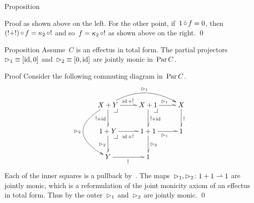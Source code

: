 \documentclass[b]{subfiles}
\begin{document}
\begin{parsec}
\begin{point}[pardp]{Proposition}
\begin{point}{Proof}
    as shown above on the left.
For the other point, if~$1 \mathop{\hat\circ} f = 0$,
    then~$(!+!)\mathop{\circ} f = \kappa_2 \mathop{\circ} !$
    and so~$f = \kappa_2 \mathop{\circ} !$ as shown above on the right. \qed
\end{point}
\end{point}
\begin{point}{Proposition}%
    Assume~$C$ is an effectus in total form.
    The partial projectors~$\mathord{\vartriangleright}_1 \equiv [\operatorname{id},0]$
        and~$\mathord{\vartriangleright}_2 \equiv [0, \operatorname{id}]$
        are jointly monic in~$\operatorname{Par} C$.
\begin{point}{Proof}%
Consider the following commuting diagram in~$\operatorname{Par} C$.
\begin{equation*}
\xymatrix {
    X+Y \pullback
    \ar@/^1.5pc/[rr]^{\pproj_1}
    \ar@/_3pc/[dd]_{\pproj_2}
        \ar@^{>}[r]^{\id+\hat!}
        \ar@^{>}[d]_{\hat! + \id}
& X+1 \pullback
        \ar@^{>}[r]^{\pproj_1}
        \ar@^{>}[d]^{\hat! + \id}
& X
        \ar@^{>}[d]^{\hat!}
\\ 1+Y \pullback
        \ar@^{>}[r]_{\id+\hat!}
        \ar@^{>}[d]_{\pproj_2}
& 1+1
        \ar@^{>}[r]_{\pproj_1}
        \ar@^{>}[d]^{\pproj_2}
& 1
\\ Y
        \ar@^{>}[r]_{\hat!}
& 1
}
\end{equation*}
Each of the inner squares is a pullback by~.
The maps~$\mathord{\vartriangleright}_1,\mathord{\vartriangleright}_2\colon 1 + 1 \rightharpoonup 1$
    are jointly monic,
    which is a reformulation
    of the joint monicity axiom of an effectus in total form.
Thus by 
    the outer~$\mathord{\vartriangleright}_1$ and~$\mathord{\vartriangleright}_2$ are jointly monic. \qed
\end{point}
\end{point}
\end{parsec}
\end{document}
